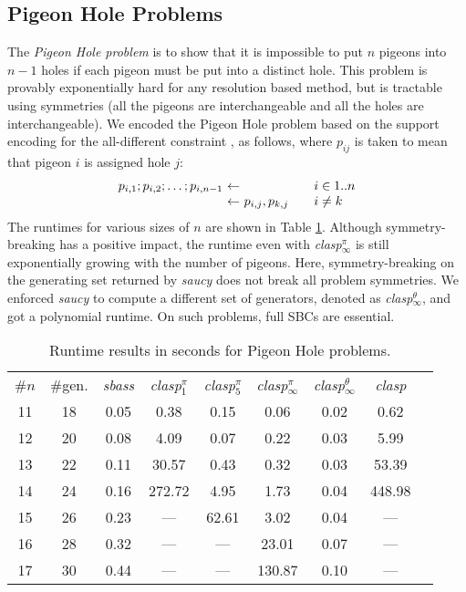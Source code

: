 \documentclass[envcountsame]{llncs}
\newcommand{\systemname}[1]{\emph{#1}}
\begin{document}
\subsection{Pigeon Hole Problems}
The \emph{Pigeon Hole problem} is to show that it is impossible to put $n$ pigeons into $n-1$ holes if each pigeon must be put into a distinct hole. This problem is provably exponentially hard for any resolution based method, but is tractable using symmetries (all the pigeons are interchangeable and all the holes are interchangeable). We encoded the Pigeon Hole problem based on the support encoding for the all-different constraint \cite{drwa10a}, as follows, where $p_{ij}$ is taken to mean that pigeon $i$ is assigned hole $j$:
\[
\begin{array}{r@{\ \leftarrow\ }l@{\qquad}l}
p_{i,1} ; p_{i,2} ; \dots ; p_{i,n-1} &  & i \in 1..n\\
& p_{i,j}, p_{k,j} & i \neq k \\
\end{array}
\]
The runtimes for various sizes of $n$ are shown in Table \ref{tab:php}. Although symmetry-breaking has a positive impact, the runtime even with \systemname{clasp}$_\infty^\pi$ is still exponentially growing with the number of pigeons. Here, symmetry-breaking on the generating set returned by \systemname{saucy} does not break all problem symmetries. We enforced \systemname{saucy} to compute a different set of generators, denoted as \systemname{clasp}$_\infty^\theta$, and got a polynomial runtime.
On such problems, full SBCs are essential.
\begin{table}
\caption{Runtime results in seconds for Pigeon Hole problems. \label{tab:php}}
\centering
\begin{tabular}{ccccccccc}
\hline\noalign{\smallskip}
\#$n$&\#gen.& \systemname{sbass} & \systemname{clasp}$_1^\pi$ & \systemname{clasp}$_{5}^\pi$ & \systemname{clasp}$_\infty^\pi$ & \systemname{clasp}$_\infty^\theta$ & \systemname{clasp}\\  
\noalign{\smallskip}
\hline
\noalign{\smallskip}
11 & 18 & 0.05 &  0.38 &  0.15 &  0.06 & 0.02 &  0.62 \\
12 & 20 & 0.08 &  4.09 &  0.07 &  0.22 & 0.03 &  5.99 \\
13 & 22 & 0.11 & 30.57 &  0.43 &  0.32 & 0.03 & 53.39 \\
14 & 24 & 0.16 &272.72 &  4.95 &  1.73 & 0.04 &448.98 \\
15 & 26 & 0.23 & ---   & 62.61 &  3.02 & 0.04 & ---   \\
16 & 28 & 0.32 & ---   & ---   & 23.01 & 0.07 & ---   \\
17 & 30 & 0.44 & ---   & ---   &130.87 & 0.10 & ---   \\
\hline
\end{tabular}
\end{table}
\end{document}
